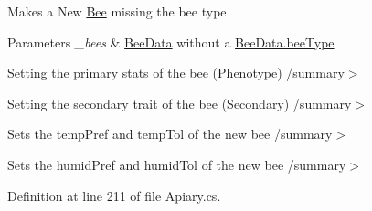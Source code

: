 Makes a New \hyperlink{namespace_bee_game_1_1_bee}{Bee} missing the bee type 


\begin{DoxyParams}{Parameters}
{\em \+\_\+bees} & \hyperlink{struct_bee_game_1_1_bee_1_1_bee_data}{Bee\+Data} without a \hyperlink{struct_bee_game_1_1_bee_1_1_bee_data_acfb6e209ae7bd1b52928580fcce4c743}{Bee\+Data.\+bee\+Type}\\
\hline
\end{DoxyParams}
Setting the primary stats of the bee (Phenotype) /summary$>$

Setting the secondary trait of the bee (Secondary) /summary$>$

Sets the temp\+Pref and temp\+Tol of the new bee /summary$>$

Sets the humid\+Pref and humid\+Tol of the new bee /summary$>$ 

Definition at line 211 of file Apiary.\+cs.



